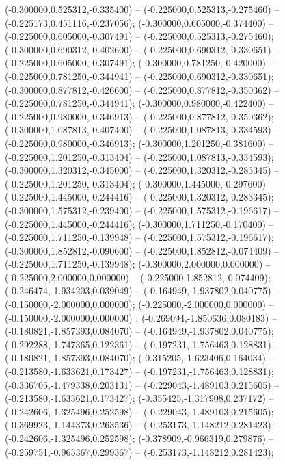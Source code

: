  (-0.300000,0.525312,-0.335400) -- (-0.225000,0.525313,-0.275460) -- (-0.225173,0.451116,-0.237056);
 (-0.300000,0.605000,-0.374400) -- (-0.225000,0.605000,-0.307491) -- (-0.225000,0.525313,-0.275460);
 (-0.300000,0.690312,-0.402600) -- (-0.225000,0.690312,-0.330651) -- (-0.225000,0.605000,-0.307491);
 (-0.300000,0.781250,-0.420000) -- (-0.225000,0.781250,-0.344941) -- (-0.225000,0.690312,-0.330651);
 (-0.300000,0.877812,-0.426600) -- (-0.225000,0.877812,-0.350362) -- (-0.225000,0.781250,-0.344941);
 (-0.300000,0.980000,-0.422400) -- (-0.225000,0.980000,-0.346913) -- (-0.225000,0.877812,-0.350362);
 (-0.300000,1.087813,-0.407400) -- (-0.225000,1.087813,-0.334593) -- (-0.225000,0.980000,-0.346913);
 (-0.300000,1.201250,-0.381600) -- (-0.225000,1.201250,-0.313404) -- (-0.225000,1.087813,-0.334593);
 (-0.300000,1.320312,-0.345000) -- (-0.225000,1.320312,-0.283345) -- (-0.225000,1.201250,-0.313404);
 (-0.300000,1.445000,-0.297600) -- (-0.225000,1.445000,-0.244416) -- (-0.225000,1.320312,-0.283345);
 (-0.300000,1.575312,-0.239400) -- (-0.225000,1.575312,-0.196617) -- (-0.225000,1.445000,-0.244416);
 (-0.300000,1.711250,-0.170400) -- (-0.225000,1.711250,-0.139948) -- (-0.225000,1.575312,-0.196617);
 (-0.300000,1.852812,-0.090600) -- (-0.225000,1.852812,-0.074409) -- (-0.225000,1.711250,-0.139948);
 (-0.300000,2.000000,0.000000) -- (-0.225000,2.000000,0.000000) -- (-0.225000,1.852812,-0.074409);
 (-0.246474,-1.934203,0.039049) -- (-0.164949,-1.937802,0.040775) -- (-0.150000,-2.000000,0.000000);
 (-0.225000,-2.000000,0.000000) -- (-0.150000,-2.000000,0.000000) ;
 (-0.269094,-1.850636,0.080183) -- (-0.180821,-1.857393,0.084070) -- (-0.164949,-1.937802,0.040775);
 (-0.292288,-1.747365,0.122361) -- (-0.197231,-1.756463,0.128831) -- (-0.180821,-1.857393,0.084070);
 (-0.315205,-1.623406,0.164034) -- (-0.213580,-1.633621,0.173427) -- (-0.197231,-1.756463,0.128831);
 (-0.336705,-1.479338,0.203131) -- (-0.229043,-1.489103,0.215605) -- (-0.213580,-1.633621,0.173427);
 (-0.355425,-1.317908,0.237172) -- (-0.242606,-1.325496,0.252598) -- (-0.229043,-1.489103,0.215605);
 (-0.369923,-1.144373,0.263536) -- (-0.253173,-1.148212,0.281423) -- (-0.242606,-1.325496,0.252598);
 (-0.378909,-0.966319,0.279876) -- (-0.259751,-0.965367,0.299367) -- (-0.253173,-1.148212,0.281423);
